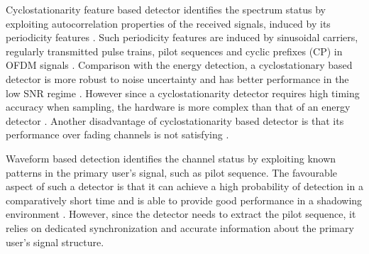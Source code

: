 Cyclostationarity feature based detector identifies the spectrum status by exploiting autocorrelation properties of the received signals, induced by its periodicity features \cite{goldsmith2009breaking}. Such periodicity features are induced by  sinusoidal carriers,  regularly transmitted pulse trains, pilot sequences and cyclic prefixes (CP) in OFDM signals \cite{akyildiz2011cooperative, umar2013comparative}.  
Comparison with the energy detection, a cyclostationary based detector is more robust to noise uncertainty and has better performance in the low SNR regime \cite{umar2013comparative}. However since a cyclostationarity detector requires high timing accuracy when sampling, the hardware is more complex than that of an energy detector \cite{yucek2009survey}. Another disadvantage of cyclostationarity based detector is that its performance over fading channels is not satisfying \cite{tandra2007snr}.   

Waveform based detection identifies the channel status by exploiting known patterns in the primary user's signal, such as pilot sequence. The favourable aspect of such a detector is that it can achieve a high probability of detection in a comparatively short time and is able to provide  good performance in a shadowing environment \cite{tang2005some}. However, since the detector needs to extract the pilot sequence, it relies on dedicated synchronization and accurate information about the primary user's signal structure.  



